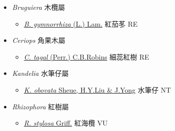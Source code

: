 
  \begin{itemize}
 \item[] \textit{Bruguiera} 木欖屬
                                
  \begin{itemize}
        \item[] \href{http://www.theplantlist.org/tpl1.1/search?q=Bruguiera+gymnorrhiza}{\textit{B. gymnorrhiza} (L.) Lam.}   紅茄苳   RE
  \end{itemize}
 \item[] \textit{Ceriops} 角果木屬
                                
  \begin{itemize}
        \item[] \href{http://www.theplantlist.org/tpl1.1/search?q=Ceriops+tagal}{\textit{C. tagal} (Perr.) C.B.Robins}   細蕊紅樹   RE
  \end{itemize}
 \item[] \textit{Kandelia} 水筆仔屬
                                
  \begin{itemize}
        \item[] \href{http://www.theplantlist.org/tpl1.1/search?q=Kandelia+obovata}{\textit{K. obovata} Sheue, H.Y.Liu \& J.Yong}   水筆仔   NT
  \end{itemize}
 \item[] \textit{Rhizophora} 紅樹屬
                                
  \begin{itemize}
        \item[] \href{http://www.theplantlist.org/tpl1.1/search?q=Rhizophora+stylosa}{\textit{R. stylosa} Griff.}   紅海欖   VU
  \end{itemize}
  \end{itemize}
